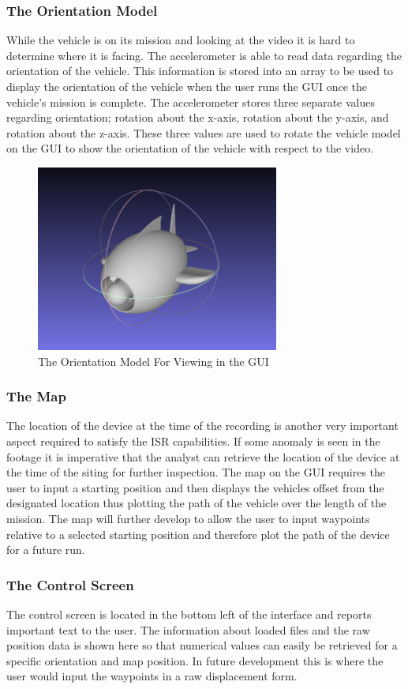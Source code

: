 \documentclass{report}
\begin{document}
\subsubsection{The Orientation Model}
While the vehicle is on its mission and looking at the video it is hard to determine where it is facing. The accelerometer is able to read data regarding the orientation of the vehicle. This information is stored into an array to be used to display the orientation of the vehicle when the user runs the GUI once the vehicle’s mission is complete. The accelerometer stores three separate values regarding orientation; rotation about the x-axis, rotation about the y-axis, and rotation about the z-axis. These three values are used to rotate the vehicle model on the GUI to show the orientation of the vehicle with respect to the video.
\begin{figure}[h]
\centering
\includegraphics[width=8cm]{"guiOrientation"}
\caption{The Orientation Model For Viewing in the GUI}
\end{figure}
\subsubsection{The Map}
The location of the device at the time of the recording is another very important aspect required to satisfy the ISR capabilities. If some anomaly is seen in the footage it is imperative that the analyst can retrieve the location of the device at the time of the siting for further inspection. The map on the GUI requires the user to input a starting position and then displays the vehicles offset from the designated location thus plotting the path of the vehicle over the length of the mission. The map will further develop to allow the user to input waypoints relative to a selected starting position and therefore plot the path of the device for a future run.
\subsubsection{The Control Screen}
The control screen is located in the bottom left of the interface and reports important text to the user. The information about loaded files and the raw position data is shown here so that numerical values can easily be retrieved for a specific orientation and map position. In future development this is where the user would input the waypoints in a raw displacement form. 
\end{document}
